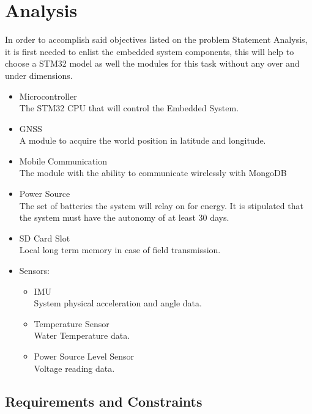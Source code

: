 \chapter{Analysis}
In order to accomplish said objectives listed on the problem Statement Analysis, it is first
needed to enlist the embedded system components, this will help to choose a STM32 model as 
well the modules for this task without any over and under dimensions.

\begin{itemize}
    \item Microcontroller \\\hspace*{1cm} The STM32 CPU that will control the Embedded System.
    \item GNSS \\\hspace*{1cm} A module to acquire the world position in latitude and longitude.
    \item Mobile Communication \\\hspace*{1cm} The module with the ability to communicate wirelessly with MongoDB 
    \item Power Source \\\hspace*{1cm} The set of batteries the system will relay on for energy. It is stipulated that
    the system must have the autonomy of at least 30 days.
    \item SD Card Slot \\ Local long term memory in case of field transmission.
    \item Sensors:
    \begin{itemize}
        \item IMU \\\hspace*{1cm} System physical acceleration and angle data.
        \item Temperature Sensor \\\hspace*{1cm} Water Temperature data.
        \item Power Source Level Sensor \\\hspace*{1cm} Voltage reading data.
    \end{itemize}
\end{itemize}

\section{Requirements and Constraints}
